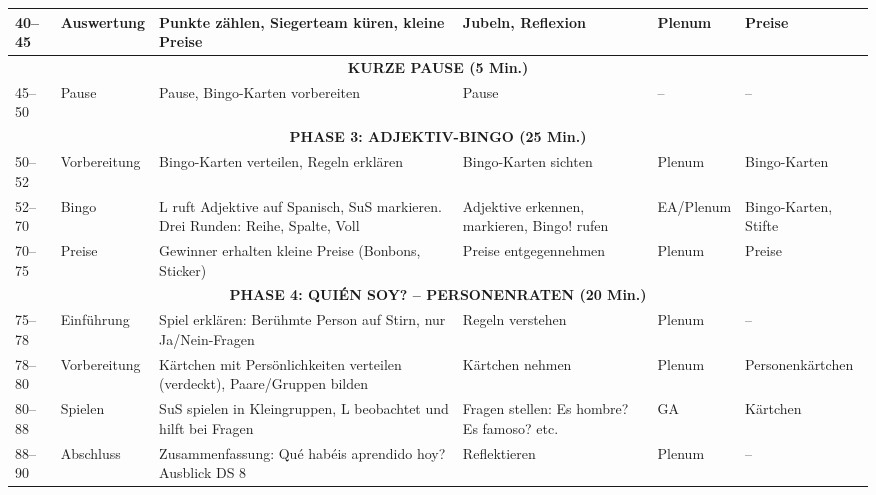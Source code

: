 \documentclass[11pt,a4paper]{article}
\begin{document}
\begin{longtable}{|p{0.8cm}|p{1.5cm}|p{4cm}|p{3cm}|p{1.5cm}|p{2cm}|}
40--45 & Auswertung & Punkte zählen, Siegerteam küren, kleine Preise & Jubeln, Reflexion & Plenum & Preise \\
\hline

\multicolumn{6}{|c|}{\textbf{KURZE PAUSE (5 Min.)}} \\
\hline

45--50 & Pause & Pause, Bingo-Karten vorbereiten & Pause & -- & -- \\
\hline

\multicolumn{6}{|c|}{\textbf{PHASE 3: ADJEKTIV-BINGO (25 Min.)}} \\
\hline

50--52 & Vorbereitung & Bingo-Karten verteilen, Regeln erklären & Bingo-Karten sichten & Plenum & Bingo-Karten \\
\hline

52--70 & Bingo & L ruft Adjektive auf Spanisch, SuS markieren. Drei Runden: Reihe, Spalte, Voll & Adjektive erkennen, markieren, \glqq{}\textexclamdown{}Bingo!\grqq{} rufen & EA/Plenum & Bingo-Karten, Stifte \\
\hline

70--75 & Preise & Gewinner erhalten kleine Preise (Bonbons, Sticker) & Preise entgegennehmen & Plenum & Preise \\
\hline

\multicolumn{6}{|c|}{\textbf{PHASE 4: \glqq{}\textquestiondown{}QUIÉN SOY?\grqq{} -- PERSONENRATEN (20 Min.)}} \\
\hline

75--78 & Einführung & Spiel erklären: Berühmte Person auf Stirn, nur Ja/Nein-Fragen & Regeln verstehen & Plenum & -- \\
\hline

78--80 & Vorbereitung & Kärtchen mit Persönlichkeiten verteilen (verdeckt), Paare/Gruppen bilden & Kärtchen nehmen & Plenum & Personenkärtchen \\
\hline

80--88 & Spielen & SuS spielen in Kleingruppen, L beobachtet und hilft bei Fragen & Fragen stellen: \glqq{}\textquestiondown{}Es hombre?\grqq{} \glqq{}\textquestiondown{}Es famoso?\grqq{} etc. & GA & Kärtchen \\
\hline

88--90 & Abschluss & Zusammenfassung: \glqq{}\textquestiondown{}Qué habéis aprendido hoy?\grqq{} Ausblick DS 8 & Reflektieren & Plenum & -- \\
\hline

\end{longtable}
\end{document}
